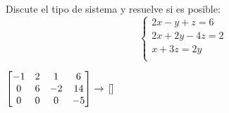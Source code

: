 \documentclass[addpoints,spanish, 12pt,a4paper]{exam}
\begin{document}
\begin{questions}
        
   
\question[2] Discute el tipo de sistema y resuelve si es posible:
  $$ \left\{\begin{matrix}2x - y + z = 6\\ 2x + 2y - 4z = 2\\ x + 3z = 2y\\ \end{matrix}\right. $$  \begin{solution}  $ \left[\begin{matrix}-1 & 2 & 1 & 6\\0 & 6 & -2 & 14\\0 & 0 & 0 & -5\end{matrix}\right] \rightarrow  \\ \left [ \right ] $  \end{solution} 




\end{questions}
\end{document}
